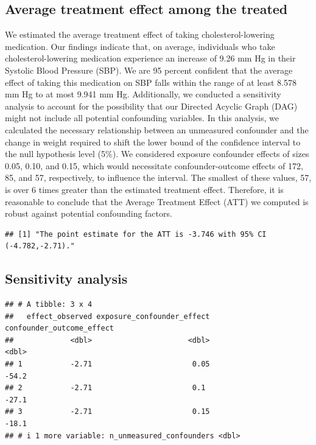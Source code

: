 \documentclass[useAMS,usenatbib,referee]{biom}
\begin{document}
\hypertarget{average-treatment-effect-among-the-treated}{%
\subsection{Average treatment effect among the
treated}\label{average-treatment-effect-among-the-treated}}

We estimated the average treatment effect of taking cholesterol-lowering
medication. Our findings indicate that, on average, individuals who take
cholesterol-lowering medication experience an increase of 9.26 mm Hg in
their Systolic Blood Pressure (SBP). We are 95 percent confident that
the average effect of taking this medication on SBP falls within the
range of at least 8.578 mm Hg to at most 9.941 mm Hg. Additionally, we
conducted a sensitivity analysis to account for the possibility that our
Directed Acyclic Graph (DAG) might not include all potential confounding
variables. In this analysis, we calculated the necessary relationship
between an unmeasured confounder and the change in weight required to
shift the lower bound of the confidence interval to the null hypothesis
level (5\%). We considered exposure confounder effects of sizes 0.05,
0.10, and 0.15, which would necessitate confounder-outcome effects of
172, 85, and 57, respectively, to influence the interval. The smallest
of these values, 57, is over 6 times greater than the estimated
treatment effect. Therefore, it is reasonable to conclude that the
Average Treatment Effect (ATT) we computed is robust against potential
confounding factors.

\begin{verbatim}
## [1] "The point estimate for the ATT is -3.746 with 95% CI (-4.782,-2.71)."
\end{verbatim}

\hypertarget{sensitivity-analysis}{%
\subsection{Sensitivity analysis}\label{sensitivity-analysis}}

\begin{verbatim}
## # A tibble: 3 x 4
##   effect_observed exposure_confounder_effect confounder_outcome_effect
##             <dbl>                      <dbl>                     <dbl>
## 1           -2.71                       0.05                     -54.2
## 2           -2.71                       0.1                      -27.1
## 3           -2.71                       0.15                     -18.1
## # i 1 more variable: n_unmeasured_confounders <dbl>
\end{verbatim}
\end{document}
